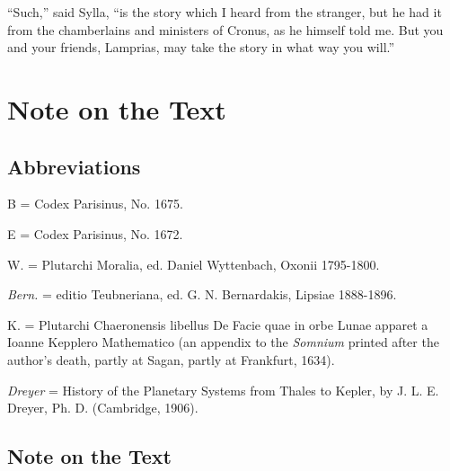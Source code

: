 \documentclass[a4paper, 11pt, oneside, polutonikogreek, english]{article}
\begin{document}
``Such,'' said Sylla, ``is the story which I heard from the stranger, but he had it from the chamberlains and ministers of Cronus, as he himself told me. But you and your friends, Lamprias, may take the story in what way you will.''
\clearpage
\section{Note on the Text}

\subsection{Abbreviations}
\begin{center}
B = Codex Parisinus, No. 1675.

E = Codex Parisinus, No. 1672.

W. = Plutarchi Moralia, ed. Daniel Wyttenbach, Oxonii 1795-1800.

\emph{Bern.} = editio Teubneriana, ed. G. N. Bernardakis, Lipsiae 1888-1896.

K. = Plutarchi Chaeronensis libellus De Facie quae in orbe Lunae apparet a Ioanne Kepplero Mathematico (an appendix to the \emph{Somnium} printed after the author's death, partly at Sagan, partly at Frankfurt, 1634).

\emph{Dreyer} = History of the Planetary Systems from Thales to Kepler, by J. L. E. Dreyer, Ph. D. (Cambridge, 1906).
\end{center}
\subsection{Note on the Text}
\end{document}
